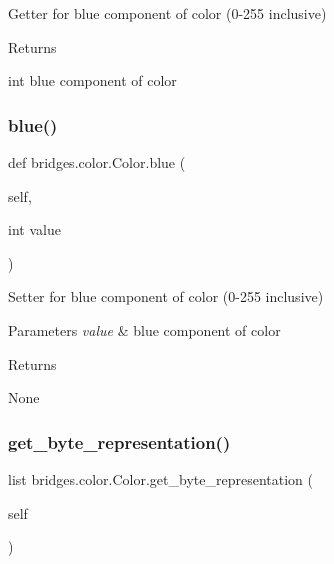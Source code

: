 Getter for blue component of color (0-\/255 inclusive) 

\begin{DoxyReturn}{Returns}


int blue component of color 
\end{DoxyReturn}
\mbox{\label{classbridges_1_1color_1_1_color_a665547ee2b0b9eff8e43b8f802a56e49}} 
\subsubsection{\texorpdfstring{blue()}{blue()}\hspace{0.1cm}{\footnotesize\ttfamily [2/2]}}
{\footnotesize\ttfamily def bridges.\+color.\+Color.\+blue (\begin{DoxyParamCaption}\item[{}]{self,  }\item[{int}]{value }\end{DoxyParamCaption})}



Setter for blue component of color (0-\/255 inclusive) 


\begin{DoxyParams}{Parameters}
{\em value} & blue component of color \\
\hline
\end{DoxyParams}
\begin{DoxyReturn}{Returns}


None 
\end{DoxyReturn}
\mbox{\label{classbridges_1_1color_1_1_color_a995abdd27110a84d9e8fb539cf3196b8}} 
\subsubsection{\texorpdfstring{get\_byte\_representation()}{get\_byte\_representation()}}
{\footnotesize\ttfamily  list bridges.\+color.\+Color.\+get\+\_\+byte\+\_\+representation (\begin{DoxyParamCaption}\item[{}]{self }\end{DoxyParamCaption})}



